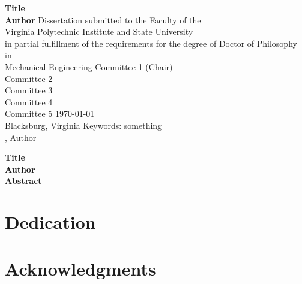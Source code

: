 
\thispagestyle{empty}
\begin{center}
\singlespacing
{\Huge\bf{}\selectfont Title\\
}
\vfill
{\Large\bf Author}
\vfill
Dissertation submitted to the Faculty of the \\
Virginia Polytechnic Institute and State University \\
in partial fulfillment of the requirements for the degree of
\vfill
Doctor of Philosophy \\
in \\
Mechanical Engineering
\vfill
Committee 1  (Chair) \\
Committee 2\\
Committee 3\\
Committee 4\\
Committee 5
\vfill
\today \\
Blacksburg, Virginia
\vfill
Keywords: something\\
, Author
\end{center}
\pagebreak
\setcounter{page}{1}
\thispagestyle{fancy}
\singlespacing
\begin{center}
{\huge 
{\Huge\bf{}\selectfont Title\\
}}
\vfill
{\Large \bf Author}\\
\vspace{10mm}
\vfill
{\center \large \bf Abstract}\\
%
 \lipsum[5]
\vfill
\end{center}
\onehalfspacing
\lipsum[300]
\vfill
\pagebreak

\doublespacing

\chapter*{Dedication}%
\begin{dedication}
\lipsum[15]
\end{dedication}
\vfill

\chapter*{\vspace{-4cm} Acknowledgments}
%
\begin{spacing}{1.5}
	\lipsum[10]
\end{spacing}
\pagebreak





